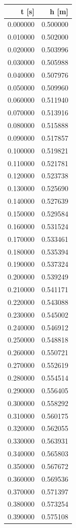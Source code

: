 \begin{tabular}{rr}
\toprule
t [s] & h [m] \\
\midrule
0.000000 & 0.500000 \\
0.010000 & 0.502000 \\
0.020000 & 0.503996 \\
0.030000 & 0.505988 \\
0.040000 & 0.507976 \\
0.050000 & 0.509960 \\
0.060000 & 0.511940 \\
0.070000 & 0.513916 \\
0.080000 & 0.515888 \\
0.090000 & 0.517857 \\
0.100000 & 0.519821 \\
0.110000 & 0.521781 \\
0.120000 & 0.523738 \\
0.130000 & 0.525690 \\
0.140000 & 0.527639 \\
0.150000 & 0.529584 \\
0.160000 & 0.531524 \\
0.170000 & 0.533461 \\
0.180000 & 0.535394 \\
0.190000 & 0.537324 \\
0.200000 & 0.539249 \\
0.210000 & 0.541171 \\
0.220000 & 0.543088 \\
0.230000 & 0.545002 \\
0.240000 & 0.546912 \\
0.250000 & 0.548818 \\
0.260000 & 0.550721 \\
0.270000 & 0.552619 \\
0.280000 & 0.554514 \\
0.290000 & 0.556405 \\
0.300000 & 0.558292 \\
0.310000 & 0.560175 \\
0.320000 & 0.562055 \\
0.330000 & 0.563931 \\
0.340000 & 0.565803 \\
0.350000 & 0.567672 \\
0.360000 & 0.569536 \\
0.370000 & 0.571397 \\
0.380000 & 0.573254 \\
0.390000 & 0.575108 \\

\end{tabular}
